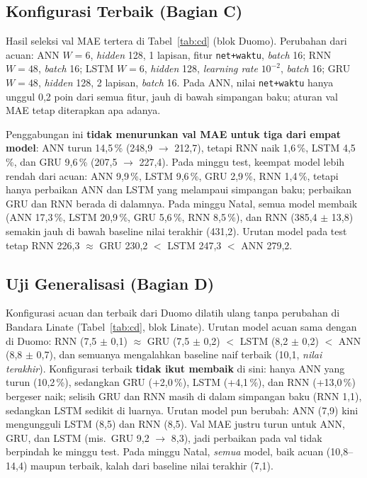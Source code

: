 \documentclass[10pt,twocolumn,a4paper]{article}
\begin{document}
\subsection{Konfigurasi Terbaik (Bagian C)}
Hasil seleksi val MAE tertera di Tabel~\ref{tab:cd} (blok Duomo). Perubahan dari acuan: ANN $W=6$, \textit{hidden} 128, 1 lapisan, fitur \texttt{net+waktu}, \textit{batch} 16; RNN $W=48$, \textit{batch} 16; LSTM $W=6$, \textit{hidden} 128, \textit{learning rate} $10^{-2}$, \textit{batch} 16; GRU $W=48$, \textit{hidden} 128, 2 lapisan, \textit{batch} 16. Pada ANN, nilai \texttt{net+waktu} hanya unggul 0,2 poin dari semua fitur, jauh di bawah simpangan baku; aturan val MAE tetap diterapkan apa adanya.

Penggabungan ini \textbf{tidak menurunkan val MAE untuk tiga dari empat model}: ANN turun 14,5\,\% (248,9 $\rightarrow$ 212,7), tetapi RNN naik 1,6\,\%, LSTM 4,5\,\%, dan GRU 9,6\,\% (207,5 $\rightarrow$ 227,4). Pada minggu test, keempat model lebih rendah dari acuan: ANN 9,9\,\%, LSTM 9,6\,\%, GRU 2,9\,\%, RNN 1,4\,\%, tetapi hanya perbaikan ANN dan LSTM yang melampaui simpangan baku; perbaikan GRU dan RNN berada di dalamnya. Pada minggu Natal, semua model membaik (ANN 17,3\,\%, LSTM 20,9\,\%, GRU 5,6\,\%, RNN 8,5\,\%), dan RNN (385,4 $\pm$ 13,8) semakin jauh di bawah baseline nilai terakhir (431,2). Urutan model pada test tetap RNN 226,3 $\approx$ GRU 230,2 $<$ LSTM 247,3 $<$ ANN 279,2.

\subsection{Uji Generalisasi (Bagian D)}
Konfigurasi acuan dan terbaik dari Duomo dilatih ulang tanpa perubahan di Bandara Linate (Tabel~\ref{tab:cd}, blok Linate). Urutan model acuan sama dengan di Duomo: RNN (7,5 $\pm$ 0,1) $\approx$ GRU (7,5 $\pm$ 0,2) $<$ LSTM (8,2 $\pm$ 0,2) $<$ ANN (8,8 $\pm$ 0,7), dan semuanya mengalahkan baseline naif terbaik (10,1, \emph{nilai terakhir}). Konfigurasi terbaik \textbf{tidak ikut membaik} di sini: hanya ANN yang turun (10,2\,\%), sedangkan GRU (+2,0\,\%), LSTM (+4,1\,\%), dan RNN (+13,0\,\%) bergeser naik; selisih GRU dan RNN masih di dalam simpangan baku (RNN 1,1), sedangkan LSTM sedikit di luarnya. Urutan model pun berubah: ANN (7,9) kini mengungguli LSTM (8,5) dan RNN (8,5). Val MAE justru turun untuk ANN, GRU, dan LSTM (mis.\ GRU 9,2 $\rightarrow$ 8,3), jadi perbaikan pada val tidak berpindah ke minggu test. Pada minggu Natal, \emph{semua} model, baik acuan (10,8--14,4) maupun terbaik, kalah dari baseline nilai terakhir (7,1).
\end{document}
